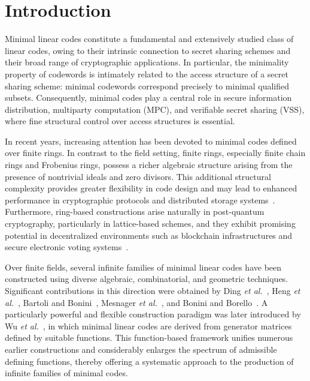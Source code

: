 \documentclass[10pt]{article}
\theoremstyle{definition}
\begin{document}
\section{Introduction}
Minimal linear codes constitute a fundamental and extensively studied class of linear codes, owing to their intrinsic connection to secret sharing schemes and their broad range of cryptographic applications. In particular, the minimality property of codewords is intimately related to the access structure of a secret sharing scheme: minimal codewords correspond precisely to minimal qualified subsets. Consequently, minimal codes play a central role in secure information distribution, multiparty computation (MPC), and verifiable secret sharing (VSS), where fine structural control over access structures is essential.

In recent years, increasing attention has been devoted to minimal codes defined over finite rings. In contrast to the field setting, finite rings, especially finite chain rings and Frobenius rings, possess a richer algebraic structure arising from the presence of nontrivial ideals and zero divisors. This additional structural complexity provides greater flexibility in code design and may lead to enhanced performance in cryptographic protocols and distributed storage systems~\cite{Cao2019,Meletiou2025}. Furthermore, ring-based constructions arise naturally in post-quantum cryptography, particularly in lattice-based schemes, and they exhibit promising potential in decentralized environments such as blockchain infrastructures and secure electronic voting systems~\cite{Munera-Merayo}.

Over finite fields, several infinite families of minimal linear codes have been constructed using diverse algebraic, combinatorial, and geometric techniques. Significant contributions in this direction were obtained by Ding \emph{et al.}~\cite{DingHengZhou}, Heng \emph{et al.}~\cite{HengDingZhou}, Bartoli and Bonini~\cite{BartoliBonini}, Mesnager \emph{et al.}~\cite{MesnagerQiRuTang}, and Bonini and Borello~\cite{BoniniBorello}. A particularly powerful and flexible construction paradigm was later introduced by Wu \emph{et al.}~\cite{WuLuCao}, in which minimal linear codes are derived from generator matrices defined by suitable functions. This function-based framework unifies numerous earlier constructions and considerably enlarges the spectrum of admissible defining functions, thereby offering a systematic approach to the production of infinite families of minimal codes.
\end{document}
